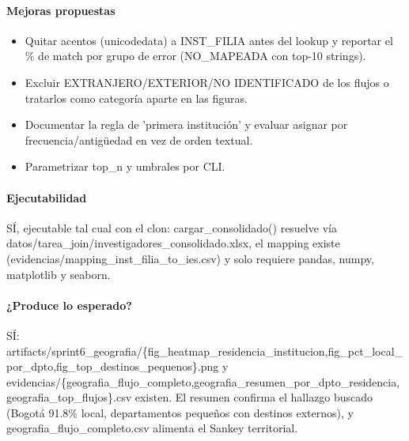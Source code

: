 \paragraph{Mejoras propuestas}
\begin{itemize}
  \item Quitar acentos (unicodedata) a INST\_FILIA antes del lookup y reportar el \% de match por grupo de error (NO\_MAPEADA con top-10 strings).
  \item Excluir EXTRANJERO/EXTERIOR/NO IDENTIFICADO de los flujos o tratarlos como categoría aparte en las figuras.
  \item Documentar la regla de 'primera institución' y evaluar asignar por frecuencia/antigüedad en vez de orden textual.
  \item Parametrizar top\_n y umbrales por CLI.
\end{itemize}

\paragraph{Ejecutabilidad}
SÍ, ejecutable tal cual con el clon: cargar\_consolidado() resuelve vía datos/tarea\_join/investigadores\_consolidado.xlsx, el mapping existe (evidencias/mapping\_inst\_filia\_to\_ies.csv) y solo requiere pandas, numpy, matplotlib y seaborn.

\paragraph{¿Produce lo esperado?}
SÍ: artifacts/sprint6\_geografia/\{fig\_heatmap\_residencia\_institucion,fig\_pct\_local\_por\_dpto,fig\_top\_destinos\_pequenos\}.png y evidencias/\{geografia\_flujo\_completo,geografia\_resumen\_por\_dpto\_residencia,geografia\_top\_flujos\}.csv existen. El resumen confirma el hallazgo buscado (Bogotá 91.8\% local, departamentos pequeños con destinos externos), y geografia\_flujo\_completo.csv alimenta el Sankey territorial.

